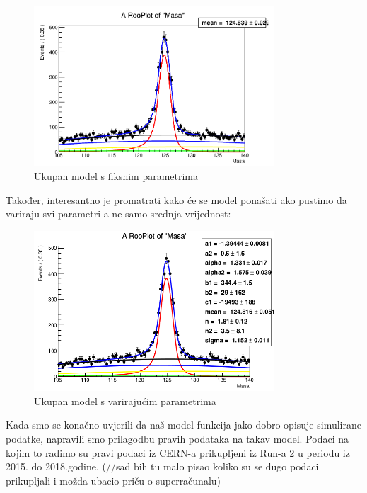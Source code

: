 \documentclass[12pt,a4paper,oneside]{article}
\begin{document}
\begin{linenumbers}
		\begin{figure}[h!]
			\centering
			\includegraphics[width=0.8\textwidth]{simulacija-mean-fixed.png}
			\caption[Saturn viđen u ultraljubičastom svjetlu.]{\label{sl:simulacija-mean-fixed} Ukupan model s fiksnim parametrima}
		\end{figure}
		Također, interesantno je promatrati kako će se model ponašati ako pustimo da variraju svi parametri a ne samo srednja vrijednost:
		\begin{figure}[h!]
			\centering
			\includegraphics[width=0.8\textwidth]{simulacija-mean.png}
			\caption[Saturn viđen u ultraljubičastom svjetlu.]{\label{sl:simulacija-mean} Ukupan model s varirajućim parametrima}
		\end{figure}
		
		Kada smo se konačno uvjerili da naš model funkcija jako dobro opisuje simulirane podatke, napravili smo prilagodbu pravih podataka na takav model. Podaci na kojim to radimo su pravi podaci iz CERN-a prikupljeni iz Run-a 2 u periodu iz 2015. do 2018.godine. (//sad bih tu malo pisao koliko su se dugo podaci prikupljali i možda ubacio priču o superračunalu)
	

\end{linenumbers}
\end{document}
